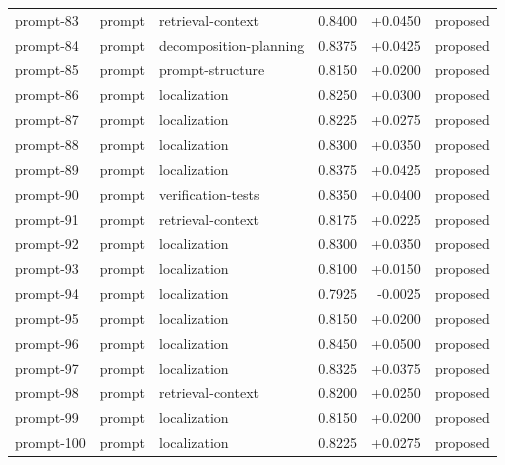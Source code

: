 \begin{center}
\begin{longtable}{llp{5.2cm}rrl}
prompt-83 & prompt & retrieval-context & 0.8400 & +0.0450 & proposed \\
prompt-84 & prompt & decomposition-planning & 0.8375 & +0.0425 & proposed \\
prompt-85 & prompt & prompt-structure & 0.8150 & +0.0200 & proposed \\
prompt-86 & prompt & localization & 0.8250 & +0.0300 & proposed \\
prompt-87 & prompt & localization & 0.8225 & +0.0275 & proposed \\
prompt-88 & prompt & localization & 0.8300 & +0.0350 & proposed \\
prompt-89 & prompt & localization & 0.8375 & +0.0425 & proposed \\
prompt-90 & prompt & verification-tests & 0.8350 & +0.0400 & proposed \\
prompt-91 & prompt & retrieval-context & 0.8175 & +0.0225 & proposed \\
prompt-92 & prompt & localization & 0.8300 & +0.0350 & proposed \\
prompt-93 & prompt & localization & 0.8100 & +0.0150 & proposed \\
prompt-94 & prompt & localization & 0.7925 & -0.0025 & proposed \\
prompt-95 & prompt & localization & 0.8150 & +0.0200 & proposed \\
prompt-96 & prompt & localization & 0.8450 & +0.0500 & proposed \\
prompt-97 & prompt & localization & 0.8325 & +0.0375 & proposed \\
prompt-98 & prompt & retrieval-context & 0.8200 & +0.0250 & proposed \\
prompt-99 & prompt & localization & 0.8150 & +0.0200 & proposed \\
prompt-100 & prompt & localization & 0.8225 & +0.0275 & proposed \\
\bottomrule\end{longtable}\end{center}
\clearpage
